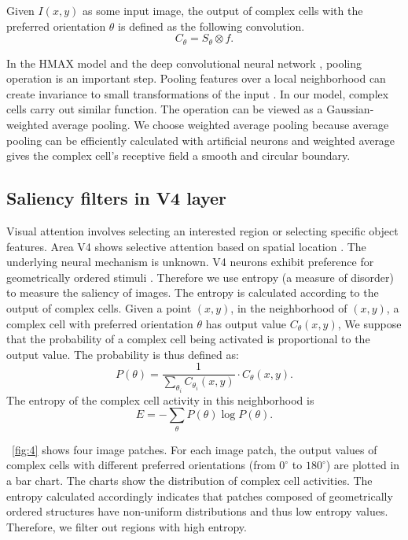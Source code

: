 \documentclass[twocolumn]{article}
\begin{document}
Given $I(x,y)$ as some input image, the output of complex cells with the preferred orientation $\theta$ is defined as the following convolution.
\begin{equation}
C_{\theta}=S_{\theta}\otimes f.
\label{equ:complex}
\end{equation}

In the HMAX model \cite{riesenhuber1999} and the deep convolutional neural network \cite{krizhevsky2012}, pooling operation is an important step.
Pooling features over a local neighborhood can create invariance to small transformations of the input \cite{boureau2010}.
In our model, complex cells carry out similar function.
The operation can be viewed as a Gaussian-weighted average pooling.
We choose weighted average pooling because average pooling can be efficiently calculated with artificial neurons
and weighted average gives the complex cell's receptive field a smooth and circular boundary.  

\subsection{Saliency filters in V4 layer}

Visual attention involves selecting an interested region or selecting specific object features.
Area V4 shows selective attention based on spatial location \cite{desimone1995}.
The underlying neural mechanism is unknown.
V4 neurons exhibit preference for geometrically ordered stimuli \cite{sasaki2005}.
Therefore we use entropy (a measure of disorder) to measure the saliency of images.
The entropy is calculated according to the output of complex cells.
Given a point $(x,y)$, in the neighborhood of $(x,y)$,
a complex cell with preferred orientation $\theta$ has output value $C_{\theta}(x,y)$,
We suppose that the probability of a complex cell being activated is proportional to the output value.
The probability is thus defined as:
\begin{equation}
P(\theta)=\frac{1}{\sum_{\theta_i} C_{\theta_i}(x,y)}\cdot C_{\theta}(x,y).
\end{equation}
The entropy of the complex cell activity in this neighborhood is 
\begin{equation}
E=-\sum_{\theta} P(\theta) \log P(\theta).
\end{equation}

\figurename~\ref{fig:4} shows four image patches.
For each image patch, the output values of complex cells with different preferred orientations (from $0^\circ$ to $180^\circ$) are plotted in a bar chart.
The charts show the distribution of complex cell activities.
The entropy calculated accordingly indicates that patches composed of geometrically ordered structures have non-uniform distributions and thus low entropy values.
Therefore, we filter out regions with high entropy.
\end{document}
